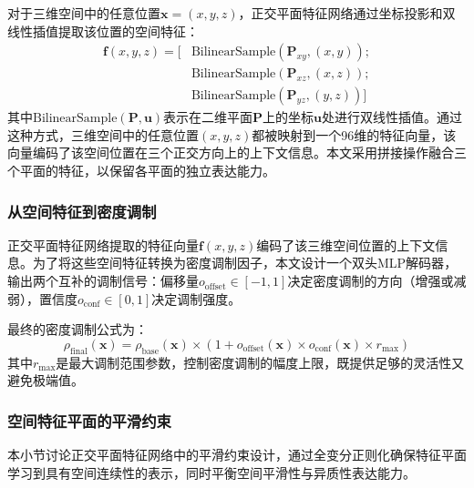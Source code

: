 对于三维空间中的任意位置$\mathbf{x} = (x, y, z)$，正交平面特征网络通过坐标投影和双线性插值提取该位置的空间特征：
\begin{equation}
\begin{aligned}
\mathbf{f}(x,y,z) = [&\text{BilinearSample}(\mathbf{P}_{xy}, (x, y)); \\
&\text{BilinearSample}(\mathbf{P}_{xz}, (x, z)); \\
&\text{BilinearSample}(\mathbf{P}_{yz}, (y, z))]
\end{aligned}
\end{equation}
其中$\text{BilinearSample}(\mathbf{P}, \mathbf{u})$表示在二维平面$\mathbf{P}$上的坐标$\mathbf{u}$处进行双线性插值。通过这种方式，三维空间中的任意位置$(x,y,z)$都被映射到一个96维的特征向量，该向量编码了该空间位置在三个正交方向上的上下文信息。本文采用拼接操作融合三个平面的特征，以保留各平面的独立表达能力。

\subsubsection{从空间特征到密度调制}

正交平面特征网络提取的特征向量$\mathbf{f}(x,y,z)$编码了该三维空间位置的上下文信息。为了将这些空间特征转换为密度调制因子，本文设计一个双头MLP解码器\cite{rosenblatt1958perceptron}，输出两个互补的调制信号：偏移量$o_{\text{offset}} \in [-1, 1]$决定密度调制的方向（增强或减弱），置信度$o_{\text{conf}} \in [0, 1]$决定调制强度。

最终的密度调制公式为：
\begin{equation}
\rho_{\text{final}}(\mathbf{x}) = \rho_{\text{base}}(\mathbf{x}) \times (1 + o_{\text{offset}}(\mathbf{x}) \times o_{\text{conf}}(\mathbf{x}) \times r_{\text{max}})
\end{equation}
其中$r_{\text{max}}$是最大调制范围参数，控制密度调制的幅度上限，既提供足够的灵活性又避免极端值。

\subsubsection{空间特征平面的平滑约束}

本小节讨论正交平面特征网络中的平滑约束设计，通过全变分正则化确保特征平面学习到具有空间连续性的表示，同时平衡空间平滑性与异质性表达能力。

